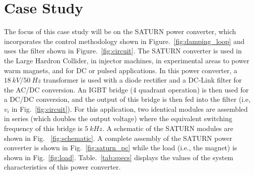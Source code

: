 \documentclass[a4paper, 10pt, conference]{ieeeconf}
\begin{document}
\section{Case Study}
\label{sec:case}
The focus of this case study will be on the SATURN power converter, which incorporates the control methodology shown in Figure.~\ref{fig:damping_loop} and uses the filter shown in Figure.~\ref{fig:circuit}. The SATURN converter is used in the Large Hardron Collider, in injector machines, in experimental areas to power warm magnets, and for DC or pulsed applications. In this power converter, a $18\:kV/50\:Hz$ transformer is used with a diode rectifier and a DC-Link filter for the AC/DC conversion. An IGBT bridge (4 quadrant operation) is then used for a DC/DC conversion, and the output of this bridge is then fed into the filter (i.e, $v_i$ in Fig.~\ref{fig:circuit}). For this application, two identical modules are assembled in series (which doubles the output voltage) where the equivalent switching frequency of this bridge is $5 \: kHz$. A schematic of the SATURN modules are shown in Fig.~ \ref{fig:schematic}. A complete assembly of the SATURN power converter is shown in Fig.~\ref{fig:saturn_pc} while the load (i.e., the magnet) is shown in Fig.~\ref{fig:load}. Table.~\ref{tab:specs} displays the values of the system characteristics of this power converter.
\end{document}
